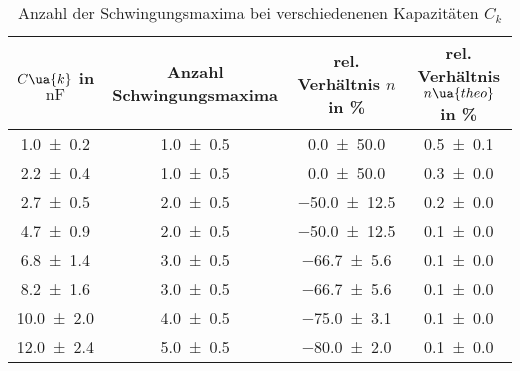\begin{table} 
\centering 
\caption{Anzahl der Schwingungsmaxima bei verschiedenenen Kapazitäten $C_k$} 
\label{teila_n_ck} 
\begin{tabular}{S S S S } 
\toprule  
{$C\ua{k}$ in $\si{\nano\farad}$} & {Anzahl Schwingungsmaxima} & {rel. Verhältnis $n$ in \%} & {rel. Verhältnis $n\ua{theo}$ in \%}  \\ 
\midrule  
 \num{1.0\pm0.2} & \num{1.0\pm0.5} & \num{0.0\pm50.0} & \num{0.5\pm0.1}\\ 
\num{2.2\pm0.4} & \num{1.0\pm0.5} & \num{0.0\pm50.0} & \num{0.3\pm0.0}\\ 
\num{2.7\pm0.5} & \num{2.0\pm0.5} & \num{-50.0\pm12.5} & \num{0.2\pm0.0}\\ 
\num{4.7\pm0.9} & \num{2.0\pm0.5} & \num{-50.0\pm12.5} & \num{0.1\pm0.0}\\ 
\num{6.8\pm1.4} & \num{3.0\pm0.5} & \num{-66.7\pm5.6} & \num{0.1\pm0.0}\\ 
\num{8.2\pm1.6} & \num{3.0\pm0.5} & \num{-66.7\pm5.6} & \num{0.1\pm0.0}\\ 
\num{10.0\pm2.0} & \num{4.0\pm0.5} & \num{-75.0\pm3.1} & \num{0.1\pm0.0}\\ 
\num{12.0\pm2.4} & \num{5.0\pm0.5} & \num{-80.0\pm2.0} & \num{0.1\pm0.0}\\ 
\bottomrule 
\end{tabular} 
\end{table}